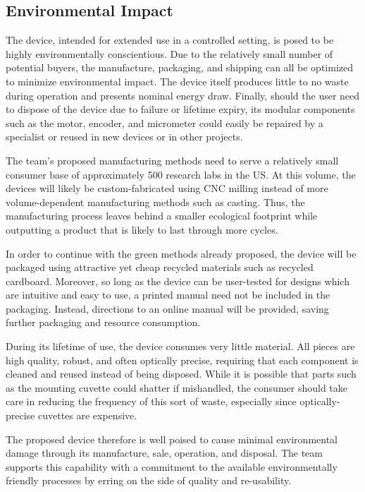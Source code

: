 \documentclass{article}
\begin{document}
\subsection{Environmental Impact}
\label{sec:environment}
 
The device, intended for extended use in a controlled setting, is
posed to be highly environmentally conscientious. Due to the
relatively small number of potential buyers, the manufacture,
packaging, and shipping can all be optimized to minimize environmental
impact. The device itself produces little to no waste during operation
and presents nominal energy draw. Finally, should the user need to
dispose of the device due to failure or lifetime expiry, its modular
components such as the motor, encoder, and micrometer could easily be
repaired by a specialist or reused in new devices or in other
projects.
 
The team's proposed manufacturing methods need to serve a relatively
small consumer base of approximately 500 research labs in the US. At
this volume, the devices will likely be custom-fabricated using CNC
milling instead of more volume-dependent manufacturing methods such as
casting. Thus, the manufacturing process leaves behind a smaller
ecological footprint while outputting a product that is likely to last
through more cycles.
 
In order to continue with the green methods already proposed, the
device will be packaged using attractive yet cheap recycled materials
such as recycled cardboard. Moreover, so long as the device can be
user-tested for designs which are intuitive and easy to use, a printed
manual need not be included in the packaging. Instead, directions to
an online manual will be provided, saving further packaging and
resource consumption.
 
During its lifetime of use, the device consumes very little
material. All pieces are high quality, robust, and often optically
precise, requiring that each component is cleaned and reused instead
of being disposed. While it is possible that parts such as the
mounting cuvette could shatter if mishandled, the consumer should take
care in reducing the frequency of this sort of waste, especially since
optically-precise cuvettes are expensive.
 
The proposed device therefore is well poised to cause minimal
environmental damage through its manufacture, sale, operation, and
disposal. The team supports this capability with a commitment to the
available environmentally friendly processes by erring on the
side of quality and re-usability.
 
\end{document}
